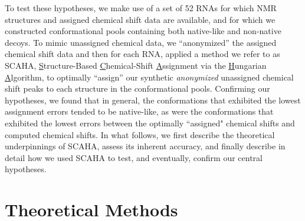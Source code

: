 \documentclass[journal=jcisd8,manuscript=article,layout=onecolumn]{achemso}
\begin{document}
To test these hypotheses, we make use of a set of 52 RNAs for which NMR structures and assigned chemical shift data are available, and for which we constructed conformational pools containing both native-like and non-native decoys. To mimic unassigned chemical data, we ``anonymized'' the assigned chemical shift data and then for each RNA, applied a method we refer to as SCAHA,  \underline{S}tructure-Based \underline{C}hemical-Shift \underline{A}ssignment via the \underline{H}ungarian \underline{A}lgorithm, to optimally ``assign'' our synthetic \textit{anonymized} unassigned chemical shift peaks to each structure in the conformational pools. Confirming our hypotheses, we found that in general,  the conformations that exhibited the lowest assignment errors tended to be native-like, as were the conformations that exhibited the lowest errors between the optimally ``assigned" chemical shifts and computed chemical shifts. In what follows, we first describe the theoretical underpinnings of SCAHA, assess its inherent accuracy,  and finally describe in detail how we used SCAHA to test, and eventually, confirm our central hypotheses.

\section{Theoretical Methods}
\end{document}
